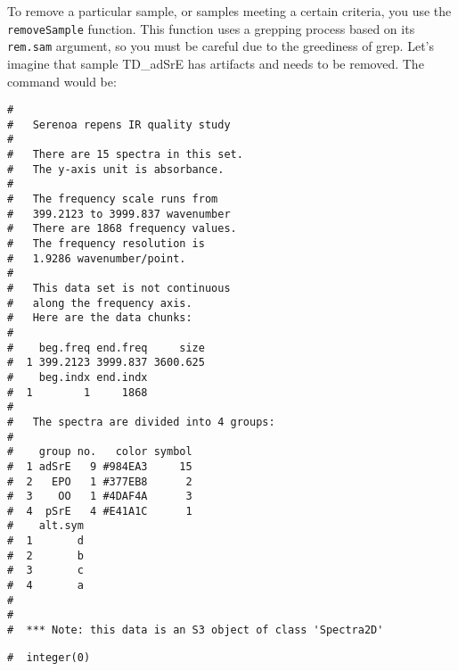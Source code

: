 \documentclass[letter,10pt,twocolumn,twoside,printwatermark=false]{pinp}
\begin{document}
To remove a particular sample, or samples meeting a certain criteria,
you use the \texttt{removeSample} function. This function uses a
grepping process based on its \texttt{rem.sam} argument, so you must be
careful due to the greediness of grep. Let's imagine that sample
TD\_adSrE has artifacts and needs to be removed. The command would be:

\begin{Shaded}
\begin{Highlighting}[]
\StringTok{ }
   \NormalTok{(}\NormalTok{))}
\end{Highlighting}
\end{Shaded}

\begin{ShadedResult}
\begin{verbatim}
#  
#   Serenoa repens IR quality study 
#  
#   There are 15 spectra in this set.
#   The y-axis unit is absorbance.
#  
#   The frequency scale runs from
#   399.2123 to 3999.837 wavenumber
#   There are 1868 frequency values.
#   The frequency resolution is
#   1.9286 wavenumber/point.
#  
#   This data set is not continuous
#   along the frequency axis.
#   Here are the data chunks:
#  
#    beg.freq end.freq     size
#  1 399.2123 3999.837 3600.625
#    beg.indx end.indx
#  1        1     1868
#  
#   The spectra are divided into 4 groups: 
#  
#    group no.   color symbol
#  1 adSrE   9 #984EA3     15
#  2   EPO   1 #377EB8      2
#  3    OO   1 #4DAF4A      3
#  4  pSrE   4 #E41A1C      1
#    alt.sym
#  1       d
#  2       b
#  3       c
#  4       a
#  
#  
#  *** Note: this data is an S3 object of class 'Spectra2D'
\end{verbatim}
\end{ShadedResult}

\begin{Shaded}
\begin{Highlighting}[]
\NormalTok{(}\OperatorTok{$}
\end{Highlighting}
\end{Shaded}

\begin{ShadedResult}
\begin{verbatim}
#  integer(0)
\end{verbatim}
\end{ShadedResult}
\end{document}

